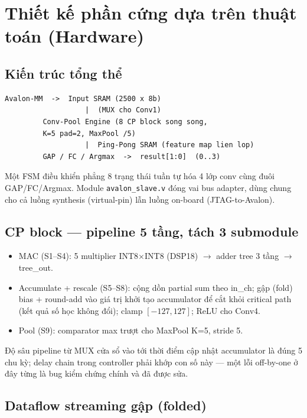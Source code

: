 \documentclass[12pt,a4paper]{article}
\begin{document}
\section{Thiết kế phần cứng dựa trên thuật toán (Hardware)}

\subsection{Kiến trúc tổng thể}

\begin{lstlisting}
Avalon-MM  ->  Input SRAM (2500 x 8b)
                   |  (MUX cho Conv1)
         Conv-Pool Engine (8 CP block song song,
         K=5 pad=2, MaxPool /5)
                   |  Ping-Pong SRAM (feature map lien lop)
         GAP / FC / Argmax  ->  result[1:0]  (0..3)
\end{lstlisting}

Một FSM điều khiển phẳng 8 trạng thái tuần tự hóa 4 lớp conv cùng đuôi GAP/FC/Argmax. Module
\texttt{avalon\_slave.v} đóng vai bus adapter, dùng chung cho cả luồng synthesis (virtual-pin)
lẫn luồng on-board (JTAG-to-Avalon).

\subsection{CP block --- pipeline 5 tầng, tách 3 submodule}
\begin{itemize}
  \item MAC (S1--S4): 5 multiplier INT8$\times$INT8 (DSP18) $\rightarrow$ adder tree 3 tầng
        $\rightarrow$ tree\_out.
  \item Accumulate + rescale (S5--S8): cộng dồn partial sum theo in\_ch; gập (fold) bias +
        round-add vào giá trị khởi tạo accumulator để cắt khỏi critical path (kết quả số học
        không đổi); clamp $[-127,127]$; ReLU cho Conv4.
  \item Pool (S9): comparator max trượt cho MaxPool K=5, stride 5.
\end{itemize}
Độ sâu pipeline từ MUX cửa sổ vào tới thời điểm cập nhật accumulator là đúng 5 chu kỳ; delay
chain trong controller phải khớp con số này --- một lỗi off-by-one ở đây từng là bug kiểm
chứng chính và đã được sửa.

\subsection{Dataflow streaming gập (folded)}
\end{document}
